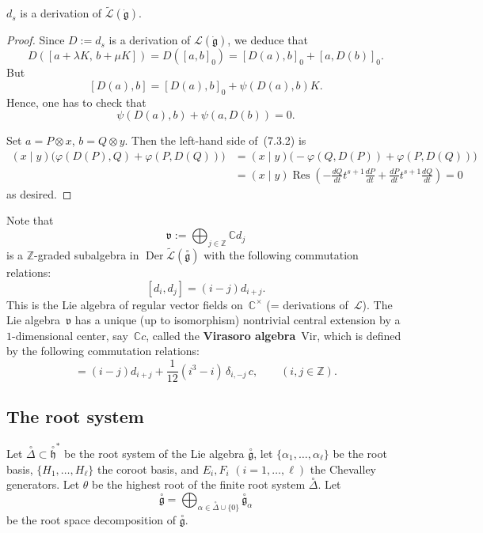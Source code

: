 \documentclass[12pt]{article}
\begin{document}
\begin{proposition}[7.3]
    $d_s$ is a derivation of $\widetilde{\mathcal{L}}(\dot{\mathfrak{g}})$.
\end{proposition}

\begin{proof}
    Since $D := d_s$ is a derivation of $\mathcal{L}(\dot{\mathfrak{g}})$, we deduce that
    \[
        D([a + \lambda K,\, b + \mu K])
        = D([a,b]_0) = [D(a),b]_0 + [a,D(b)]_0.
    \]
    But
    \[
        [D(a),b] = [D(a),b]_0 + \psi(D(a),b)K.
    \]
    Hence, one has to check that
    \begin{equation}
        \psi(D(a),b) + \psi(a,D(b)) = 0.
        \tag{7.3.2}
    \end{equation}

    Set $a = P \otimes x$, $b = Q \otimes y$.
    Then the left-hand side of~(7.3.2) is
    \begin{align*}
        (x\mid y)\big(\varphi(D(P),Q) + \varphi(P,D(Q))\big)
         & = (x\mid y)\big(-\varphi(Q,D(P)) + \varphi(P,D(Q))\big) \\
         & = (x\mid y)\operatorname{Res}\!\left(
        -\frac{dQ}{dt}t^{s+1}\frac{dP}{dt}
        + \frac{dP}{dt}t^{s+1}\frac{dQ}{dt}
        \right) = 0
    \end{align*}
    as desired.
\end{proof}
Note that
\[
    \mathfrak{v} := \bigoplus_{j \in \mathbb{Z}} \mathbb{C} d_j
\]
is a $\mathbb{Z}$-graded subalgebra in $\operatorname{Der}\widetilde{\mathcal{L}}(\overset{\circ}{\mathfrak{g}})$
with the following commutation relations:
\[
    [d_i, d_j] = (i - j)d_{i+j}.
\]
This is the Lie algebra of regular vector fields on~$\mathbb{C}^\times$
(= derivations of~$\mathcal{L}$). The Lie algebra~$\mathfrak{v}$ has a unique (up to isomorphism) nontrivial central extension
by a $1$-dimensional center, say~$\mathbb{C}c$, called the \textbf{Virasoro algebra}~$\mathrm{Vir}$,
which is defined by the following commutation relations:
\begin{equation}
    [d_i, d_j] = (i - j)d_{i+j} + \frac{1}{12}(i^3 - i)\,\delta_{i,-j}\,c,
    \qquad (i,j \in \mathbb{Z}).
    \tag{7.3.3}
\end{equation}

\subsection{The root system}
Let $\overset{\circ}{\Delta} \subset \overset{\circ}{\mathfrak{h}}^*$ be the root system of the Lie algebra
$\overset{\circ}{\mathfrak{g}}$, let $\{\alpha_1,\dots,\alpha_\ell\}$ be the root basis,
$\{H_1,\dots,H_\ell\}$ the coroot basis, and $E_i, F_i$ $(i=1,\dots,\ell)$ the Chevalley generators.
Let $\theta$ be the highest root of the finite root system $\overset{\circ}{\Delta}$.
Let
\[
    \overset{\circ}{\mathfrak{g}}
    = \bigoplus_{\alpha \in \overset{\circ}{\Delta} \cup \{0\}}
    \overset{\circ}{\mathfrak{g}}_\alpha
\]
be the root space decomposition of $\overset{\circ}{\mathfrak{g}}$.
\end{document}
